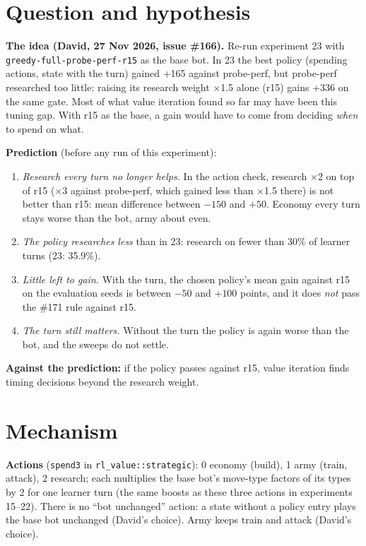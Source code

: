 \documentclass{../polyexp}
\begin{document}

\ExpHeader

\section{Question and hypothesis}
\textbf{The idea (David, 27 Nov 2026, issue \#166).} Re-run experiment 23 with \texttt{greedy-full-probe-perf-r15}
as the base bot. In 23 the best policy (spending actions, state with the turn) gained +165 against probe-perf, but
probe-perf researched too little: raising its research weight ×1.5 alone (r15) gains +336 on the same gate. Most of
what value iteration found so far may have been this tuning gap. With r15 as the base, a gain would have to come
from deciding \emph{when} to spend on what.

\textbf{Prediction} (before any run of this experiment):
\begin{enumerate}
  \item \emph{Research every turn no longer helps.} In the action check, research ×2 on top of r15 (×3 against
        probe-perf, which gained less than ×1.5 there) is not better than r15: mean difference between $-150$ and
        $+50$. Economy every turn stays worse than the bot, army about even.
  \item \emph{The policy researches less} than in 23: research on fewer than 30\% of learner turns (23: 35.9\%).
  \item \emph{Little left to gain.} With the turn, the chosen policy's mean gain against r15 on the evaluation seeds
        is between $-50$ and $+100$ points, and it does \emph{not} pass the \#171 rule against r15.
  \item \emph{The turn still matters.} Without the turn the policy is again worse than the bot, and the sweeps do
        not settle.
\end{enumerate}
\textbf{Against the prediction:} if the policy passes against r15, value iteration finds timing decisions beyond
the research weight.

\section{Mechanism}
\textbf{Actions} (\texttt{spend3} in \texttt{rl\_value::strategic}): 0 economy (build), 1 army (train, attack),
2 research; each multiplies the base bot's move-type factors of its types by 2 for one learner turn (the same
boosts as these three actions in experiments 15--22). There is no ``bot unchanged'' action: a state without a policy
entry plays the base bot unchanged (David's choice). Army keeps train and attack (David's choice).
\end{document}
